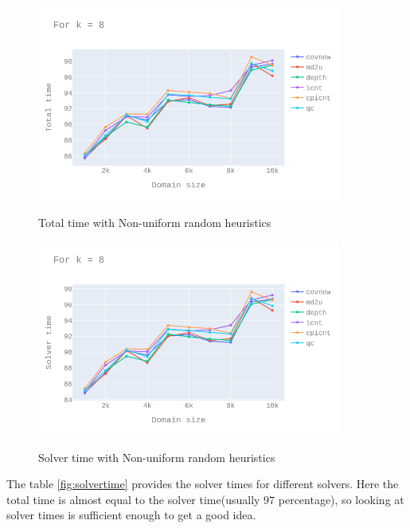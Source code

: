 \documentclass[11pt,a4paper,notitlepage]{article}
\begin{document}
\begin{figure}[h]
\centering
\includegraphics[width=10cm]{k_8_tt_nonuni_heur.png}
\label{fig:nonuni_heur_tt}
\caption{Total time with Non-uniform random heuristics}
\centering
\end{figure}

\begin{figure}[h]
\centering
\includegraphics[width=10cm]{k_8_st_nonuni_heur.png}
\label{fig:nonuni_heur_st}
\caption{Solver time with Non-uniform random heuristics}
\centering
\end{figure}

The table \ref{fig:solvertime} provides the solver times for different solvers.
Here the total time is almost equal to the solver time(usually $97$ percentage),
so looking at solver times is sufficient enough to get a good idea.
\end{document}
